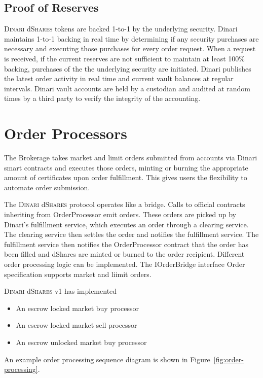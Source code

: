 \documentclass[sigconf,nonacm,prologue,table]{acmart}
\newcommand{\dshares}{\textsc{Dinari} d\textsc{Shares} }
\begin{document}
\subsection{Proof of Reserves}

\dshares tokens are backed 1-to-1 by the underlying security. Dinari maintains 1-to-1 backing in real time by determining if any security purchases are necessary and executing those purchases for every order request. When a request is received, if the current reserves are not sufficient to maintain at least 100\% backing, purchases of the the underlying security are initiated. Dinari publishes the latest order activity in real time and current vault balances at regular intervals. Dinari vault accounts are held by a custodian and audited at random times by a third party to verify the integrity of the accounting. 

\section{Order Processors}
\label{sec:Processors}

The Brokerage takes market and limit orders submitted from accounts via Dinari smart contracts and executes those orders, minting or burning the appropriate amount of certificates upon order fulfillment. This gives users the flexibility to automate order submission.

The \dshares protocol operates like a bridge. Calls to official contracts inheriting from OrderProcessor emit orders. These orders are picked up by Dinari's fulfillment service, which executes an order through a clearing service. The clearing service then settles the order and notifies the fulfillment service. The fulfillment service then notifies the OrderProcessor contract that the order has been filled and dShares are minted or burned to the order recipient. Different order processing logic can be implemented. The IOrderBridge interface Order specification supports market and liimit orders.

\dshares v1 has implemented
\begin{itemize}
    \item An escrow locked market buy processor
    \item An escrow locked market sell processor
    \item An escrow unlocked market buy processor
\end{itemize}

An example order processing sequence diagram is shown in Figure~\ref{fig:order-processing}.
\end{document}
